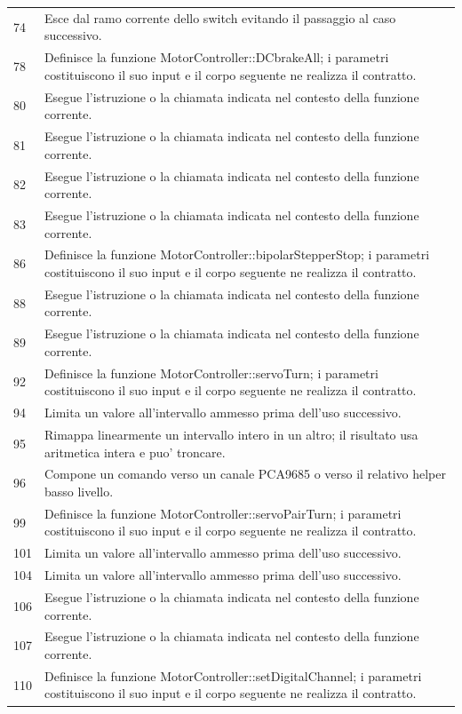 \documentclass[11pt,a4paper]{article}
\begin{document}
\begin{longtable}{p{}p{}}
74 & Esce dal ramo corrente dello switch evitando il passaggio al caso successivo. \\
78 & Definisce la funzione MotorController::DCbrakeAll; i parametri costituiscono il suo input e il corpo seguente ne realizza il contratto. \\
80 & Esegue l'istruzione o la chiamata indicata nel contesto della funzione corrente. \\
81 & Esegue l'istruzione o la chiamata indicata nel contesto della funzione corrente. \\
82 & Esegue l'istruzione o la chiamata indicata nel contesto della funzione corrente. \\
83 & Esegue l'istruzione o la chiamata indicata nel contesto della funzione corrente. \\
86 & Definisce la funzione MotorController::bipolarStepperStop; i parametri costituiscono il suo input e il corpo seguente ne realizza il contratto. \\
88 & Esegue l'istruzione o la chiamata indicata nel contesto della funzione corrente. \\
89 & Esegue l'istruzione o la chiamata indicata nel contesto della funzione corrente. \\
92 & Definisce la funzione MotorController::servoTurn; i parametri costituiscono il suo input e il corpo seguente ne realizza il contratto. \\
94 & Limita un valore all'intervallo ammesso prima dell'uso successivo. \\
95 & Rimappa linearmente un intervallo intero in un altro; il risultato usa aritmetica intera e puo' troncare. \\
96 & Compone un comando verso un canale PCA9685 o verso il relativo helper basso livello. \\
99 & Definisce la funzione MotorController::servoPairTurn; i parametri costituiscono il suo input e il corpo seguente ne realizza il contratto. \\
101 & Limita un valore all'intervallo ammesso prima dell'uso successivo. \\
104 & Limita un valore all'intervallo ammesso prima dell'uso successivo. \\
106 & Esegue l'istruzione o la chiamata indicata nel contesto della funzione corrente. \\
107 & Esegue l'istruzione o la chiamata indicata nel contesto della funzione corrente. \\
110 & Definisce la funzione MotorController::setDigitalChannel; i parametri costituiscono il suo input e il corpo seguente ne realizza il contratto. \\

\end{longtable}
\end{document}
